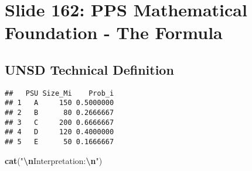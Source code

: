 \documentclass[
]{article}
\newenvironment{Shaded}{\begin{snugshade}}{\end{snugshade}}
\newcommand{\AttributeTok}[1]{\textcolor[rgb]{0.13,0.29,0.53}{#1}}
\newcommand{\CommentTok}[1]{\textcolor[rgb]{0.56,0.35,0.01}{\textit{#1}}}
\newcommand{\ConstantTok}[1]{\textcolor[rgb]{0.56,0.35,0.01}{#1}}
\newcommand{\DecValTok}[1]{\textcolor[rgb]{0.00,0.00,0.81}{#1}}
\newcommand{\FunctionTok}[1]{\textcolor[rgb]{0.13,0.29,0.53}{\textbf{#1}}}
\newcommand{\NormalTok}[1]{#1}
\newcommand{\OtherTok}[1]{\textcolor[rgb]{0.56,0.35,0.01}{#1}}
\newcommand{\SpecialCharTok}[1]{\textcolor[rgb]{0.81,0.36,0.00}{\textbf{#1}}}
\newcommand{\StringTok}[1]{\textcolor[rgb]{0.31,0.60,0.02}{#1}}
\begin{document}
\section{Slide 162: PPS Mathematical Foundation - The
Formula}\label{slide-162-pps-mathematical-foundation---the-formula}

\subsection{UNSD Technical Definition}\label{unsd-technical-definition}

\begin{Shaded}
\end{Shaded}

\begin{verbatim}
##   PSU Size_Mi    Prob_i
## 1   A     150 0.5000000
## 2   B      80 0.2666667
## 3   C     200 0.6666667
## 4   D     120 0.4000000
## 5   E      50 0.1666667
\end{verbatim}

\begin{Shaded}
\begin{Highlighting}[]
\FunctionTok{cat}\NormalTok{(}\StringTok{"}\SpecialCharTok{\textbackslash{}n}\StringTok{Interpretation:}\SpecialCharTok{\textbackslash{}n}\StringTok{"}\NormalTok{)}
\end{Highlighting}
\end{Shaded}
\end{document}
